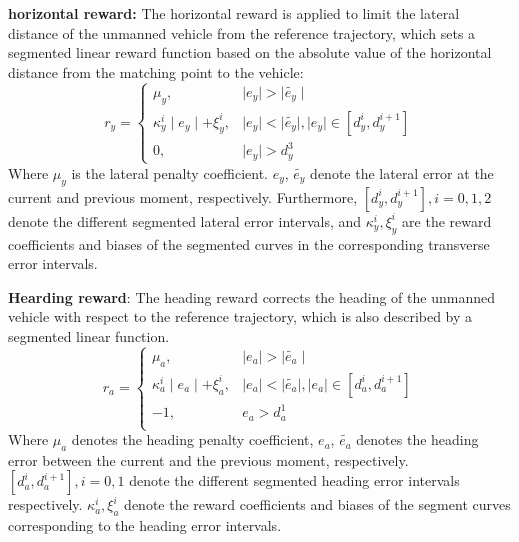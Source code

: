 \documentclass[sn-mathphys]{sn-jnl}%
\theoremstyle{thmstyleone}%
\theoremstyle{thmstyletwo}%
\theoremstyle{thmstylethree}%
\begin{document}
\textbf{horizontal reward:} The horizontal reward is applied to limit the lateral distance of the unmanned vehicle from the reference trajectory, which sets a segmented linear reward function based on the absolute value of the horizontal distance from the matching point to the vehicle:
\begin{equation}
\label{eq:lateral}
r_y=\begin{cases}
\mu_y, &\mid e_{y} \mid > \mid \widetilde{e_y} \mid \\
\kappa_y^i \mid e_{y} \mid+\xi_y^i , & \mid e_y\mid < \mid  \widetilde{e_y} \mid,  \mid e_y \mid  \in \left[d_y^i,d_y^{i+1}\right]  \\
0, &\mid e_y \mid > d_y^3
\end{cases}
\end{equation}
Where $ \mu_y $ is the lateral penalty coefficient. $ e_{y} $, $ \widetilde{e_y} $ denote the lateral error at the current and previous moment, respectively. Furthermore, $ \left[d_y^i,d_y^{i+1}\right], i=0,1,2 $ denote the different segmented lateral error intervals, and $ \kappa_y^i, \xi_y^i $ are the reward coefficients and biases of the segmented curves in the corresponding transverse error intervals.

\textbf{Hearding reward}: The heading reward corrects the heading of the unmanned vehicle with respect to the reference trajectory, which is also described by a segmented linear function.
\begin{equation}
r_a=\begin{cases}
\mu_a, &\mid e_{a}\mid >\mid \widetilde{e_a} \mid \\
\kappa_a^i \mid e_{a} \mid+\xi_a^i, &\mid e_{a}\mid < \mid \widetilde{e_a} \mid, \mid e_a \mid  \in \left[d_a^i,d_a^{i+1}\right] \\
-1 , &e_{a} > d_a^1\\
\end{cases}
\end{equation}
Where $ \mu_a $ denotes the heading penalty coefficient, $ e_{a} $, $ \widetilde{e_{a}}$ denotes the heading error between the current and the previous moment, respectively. $\left[d_a^i,d_a^{i+1}\right], i=0,1 $ denote the different segmented heading error intervals respectively. $\kappa_a^i, \xi_a^i$ denote the reward coefficients and biases of the segment curves corresponding to the heading error intervals.
\end{document}
